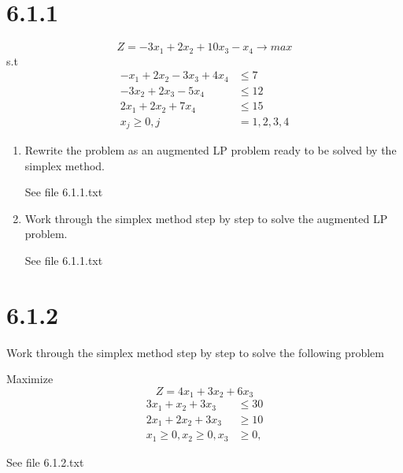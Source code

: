 \documentclass{article}
\begin{document}
\section*{6.1.1}
\begin{equation*}
  Z = -3x_{1} + 2x_{2} + 10x_{3} - x_{4} \rightarrow max
\end{equation*}
s.t
\begin{align*}
-x_{1} + 2x_{2} - 3x_{3} + 4x_{4} &\leq 7\\
       - 3x_{2} + 2x_{3} - 5x_{4} &\leq 12\\
2x_{1} + 2x_{2}          + 7x_{4} &\leq 15\\
x_{j} \geq 0, j &= 1, 2, 3, 4
\end{align*}
\begin{enumerate}
  \item Rewrite the problem as an augmented LP problem ready to be solved by the simplex method.
  
  See file 6.1.1.txt
  
  \item Work through the simplex method step by step to solve the augmented LP problem.
  
  See file 6.1.1.txt
\end{enumerate}

\section*{6.1.2}
Work through the simplex method step by step to solve the following problem

Maximize
\begin{equation*}
  Z = 4x_{1} + 3x_{2} + 6x_{3}
\end{equation*}
\begin{align*}
  3x_{1} + x_{2} + 3x_{3} &\leq 30\\
  2x_{1} + 2x_{2} + 3x_{3} &\geq 10\\
  x_{1} \geq 0, x_{2} \geq 0, x_{3} &\geq 0,
\end{align*}

See file 6.1.2.txt
\end{document}
